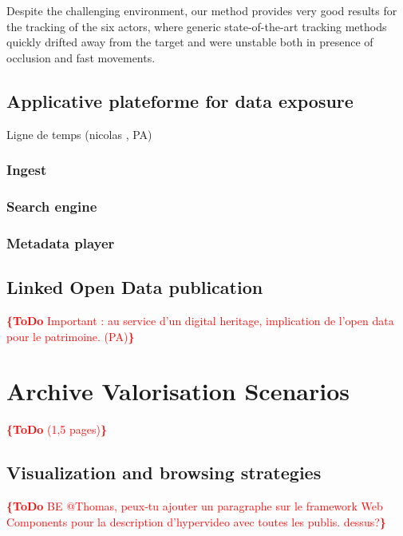 \documentclass[conference]{IEEEtran}
\newcommand{\todo}[1]{\noindent\textcolor{red}{{\bf \{ToDo} #1{\bf \}}}}
\begin{document}
Despite the challenging environment, our method provides very good results for the tracking of the six actors, where generic state-of-the-art tracking methods quickly drifted away from the target  and were unstable both in presence of occlusion and fast movements. 





\subsection{Applicative plateforme for data exposure}
Ligne de temps (nicolas , PA)

\subsubsection{Ingest}

\subsubsection{Search engine}

\subsubsection{Metadata player}

\subsection{Linked Open Data  publication}
\todo{Important : au service d'un digital heritage, implication de l'open data pour le patrimoine. (PA)}


\section{Archive Valorisation Scenarios}
\todo{(1,5 pages)}

\subsection{Visualization and browsing strategies}
\todo{BE @Thomas, peux-tu ajouter un paragraphe sur le framework Web Components pour la description d'hypervideo avec toutes les publis. dessus?}
\end{document}
